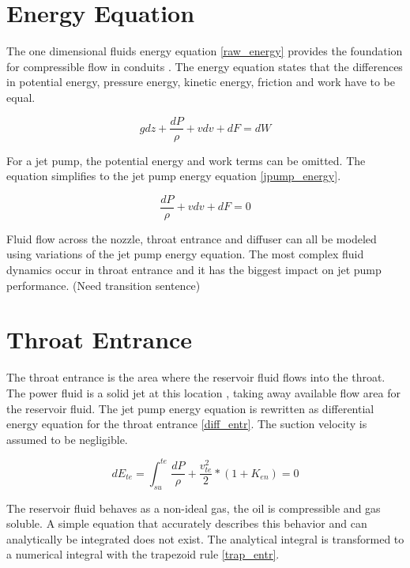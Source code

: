\documentclass{article}
\begin{document}
\section{Energy Equation}

The one dimensional fluids energy equation \eqref{raw_energy} provides the foundation for compressible flow in conduits \cite{fluids_cheme}. The energy equation states that the differences in potential energy, pressure energy, kinetic energy, friction and work have to be equal.

\begin{equation}
gdz + \frac{dP}{\rho} + vdv + dF = dW
\label{raw_energy}
\end{equation}

For a jet pump, the potential energy and work terms can be omitted. The equation simplifies to the jet pump energy equation \eqref{jpump_energy}.

\begin{equation}
\frac{dP}{\rho} + vdv + dF = 0
\label{jpump_energy}
\end{equation}

Fluid flow across the nozzle, throat entrance and diffuser can all be modeled using variations of the jet pump energy equation. The most complex fluid dynamics occur in throat entrance and it has the biggest impact on jet pump performance. (Need transition sentence)

\section{Throat Entrance}

The throat entrance is the area where the reservoir fluid flows into the throat. The power fluid is a solid jet at this location \cite{cunn_break}, taking away available flow area for the reservoir fluid. The jet pump energy equation is rewritten as differential energy equation for the throat entrance \eqref{diff_entr}. The suction velocity is assumed to be negligible.

\begin{equation}
dE_{te} = \int_{su}^{te} \frac{dP}{\rho} + \frac{v_{te}^{2}}{2} * (1+K_{en}) = 0
\label{diff_entr}
\end{equation}

The reservoir fluid behaves as a non-ideal gas, the oil is compressible and gas soluble. A simple equation that accurately describes this behavior and can analytically be integrated does not exist. The analytical integral is transformed to a numerical integral with the trapezoid rule \eqref{trap_entr}.
\end{document}
